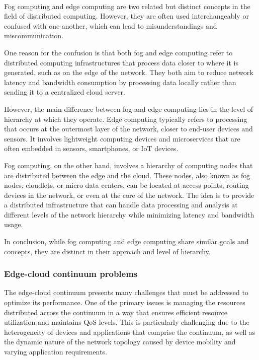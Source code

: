 \paragraph*{}

Fog computing and edge computing are two related but distinct concepts in the field of distributed computing. However, they are often used
interchangeably or confused with one another, which can lead to misunderstandings and miscommunication.

One reason for the confusion is that both fog and edge computing refer to distributed computing infrastructures that process data closer to where it
is generated, such as on the edge of the network. They both aim to reduce network latency and bandwidth consumption by processing data locally rather
than sending it to a centralized cloud server.

However, the main difference between fog and edge computing lies in the level of hierarchy at which they operate. Edge computing typically refers to
processing that occurs at the outermost layer of the network, closer to end-user devices and sensors. It involves lightweight computing devices and
microservices that are often embedded in sensors, smartphones, or IoT devices.

Fog computing, on the other hand, involves a hierarchy of computing nodes that are distributed between the edge and the cloud. These nodes, also
known as fog nodes, cloudlets, or micro data centers, can be located at access points, routing devices in the network, or even at the core of the
network. The idea is to provide a distributed infrastructure that can handle data processing and analysis at different levels of the network
hierarchy while minimizing latency and bandwidth usage.

In conclusion, while fog computing and edge computing share similar goals and concepts, they are distinct in their approach and level of hierarchy.

\subsubsection{Edge-cloud continuum problems}

The edge-cloud continuum presents many challenges that must be addressed to optimize its performance. One of the primary issues is
managing the resources distributed across the continuum in a way that ensures efficient resource utilization and maintains QoS levels. This is
particularly challenging due to the heterogeneity of devices and applications that comprise the continuum, as well as the dynamic nature of the
network topology caused by device mobility and varying application requirements.

